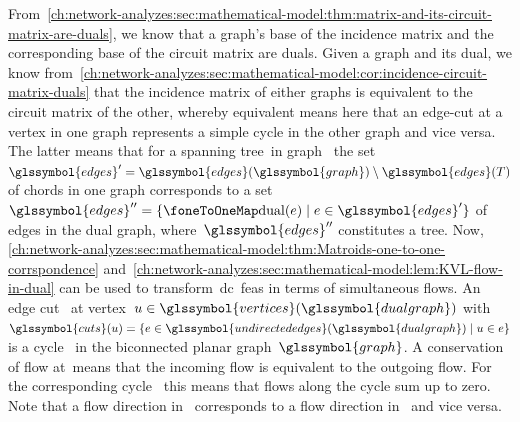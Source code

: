 From~\cref{ch:network-analyzes:sec:mathematical-model:thm:matrix-and-its-circuit-matrix-are-duals},
we know that a graph's base of the incidence matrix and the corresponding base
of the circuit matrix are duals. Given a graph and its dual, we know
from~\cref{ch:network-analyzes:sec:mathematical-model:cor:incidence-circuit-matrix-duals}
that the incidence matrix of either graphs is equivalent to the circuit matrix
of the other, whereby equivalent means here that an edge-cut at a vertex in one
graph represents a simple cycle in the other graph and vice versa. The latter
means that for a spanning tree~\tree in graph~ the set~$
    \glssymbol{edges}' 
    = 
    \glssymbol{edges}(\glssymbol{graph})
    \setminus
    \glssymbol{edges}(\tree)
$ of chords in one graph corresponds to a set~$
    \glssymbol{edges}'' 
    =
    \{
        \oneToOneMap(\edge)
        \mid
        \edge
        \in
        \glssymbol{edges}'
    \}
$ of edges in the dual graph, where~$\glssymbol{edges}''$ constitutes a tree.
Now,
\cref{ch:network-analyzes:sec:mathematical-model:thm:Matroids-one-to-one-corrspondence}
and~\cref{ch:network-analyzes:sec:mathematical-model:lem:KVL-flow-in-dual} can
be used to transform~\gls{dc}~\gls{feas} in terms of simultaneous flows. An edge
cut~ at vertex~$
% 
\vertexa
\in
\glssymbol{vertices}(\glssymbol{dualgraph})
% 
$ with~$
% 
\glssymbol{cuts}(\vertexa)
=
\{
    \edge
    \in
    \glssymbol{undirectededges}(\glssymbol{dualgraph})
    \mid
    \vertexa
    \in
    \edge
\}
% 
$ is a cycle~ in the biconnected planar
graph~$\glssymbol{graph}$. A conservation of flow at~\vertexa means that the
incoming flow is equivalent to the outgoing flow. For the corresponding
cycle~ this means that flows along the cycle sum up to zero.
Note that a flow direction in~ corresponds to a flow direction
in~ and vice versa.

